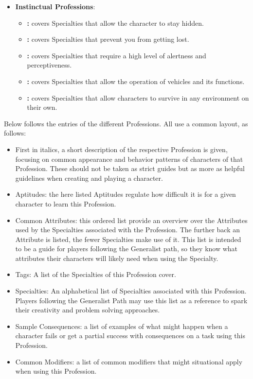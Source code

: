 \begin{itemize}
		\item \textbf{Instinctual Professions}:
		\begin{itemize}
			\item \textbf{:} covers Specialties that allow the character to stay hidden.
			\item \textbf{:} covers Specialties that prevent you from getting lost.
			\item \textbf{:} covers Specialties that require a high level of alertness and perceptiveness.
			\item \textbf{:} covers Specialties that allow the operation of vehicles and its functions.
			\item \textbf{:} covers Specialties that allow characters to survive in any environment on their own.
		\end{itemize}
	\end{itemize}

	Below follows the entries of the different Professions. 
	All use a common layout, as follows:
	\begin{itemize}
		\item First in italics, a short description of the respective Profession is given, focusing on common appearance and behavior patterns of characters of that Profession.
		These should not be taken as strict guides but as more as helpful guidelines when creating and playing a character.
		\item Aptitudes: the here listed Aptitudes regulate how difficult it is for a given character to learn this Profession.
		\item Common Attributes: this ordered list provide an overview over the Attributes used by the Specialties associated with the Profession. 
		The further back an Attribute is listed, the fewer Specialties make use of it.
		This list is intended to be a guide for players following the Generalist path, so they know what attributes their characters will likely need when using the Specialty.
		\item Tags: A list of  the Specialties of this Profession cover.
		\item Specialties: An alphabetical list of Specialties associated with this Profession.
		Players following the Generalist Path may use this list as a reference to spark their creativity and problem solving approaches.
		\item Sample Consequences: a list of examples of what might happen when a character fails or get a partial success with consequences on a task using this Profession.
		\item Common Modifiers: a list of common modifiers that might situational apply when using this Profession.
	\end{itemize}


